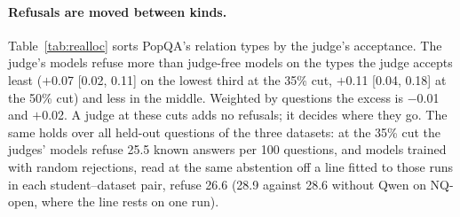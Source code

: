 \begin{table}[H]
\small
\centering
\setlength{\tabcolsep}{3.5pt}
\caption{A strict judge moves refusals between relation types. PopQA relation types sorted into fifths by how often the judge accepts the student's right answers of that type; share of known held-out answers refused by the judge's models and by models trained with random rejections at matched abstention. Four judges and both students pooled.}
\label{tab:realloc}
\end{table}

\paragraph{Refusals are moved between kinds.} Table~\ref{tab:realloc} sorts PopQA's relation types by the judge's acceptance. The judge's models refuse more than judge-free models on the types the judge accepts least ($+$0.07 [0.02, 0.11] on the lowest third at the 35\% cut, $+$0.11 [0.04, 0.18] at the 50\% cut) and less in the middle. Weighted by questions the excess is $-$0.01 and $+$0.02. A judge at these cuts adds no refusals; it decides where they go. The same holds over all held-out questions of the three datasets: at the 35\% cut the judges' models refuse 25.5 known answers per 100 questions, and models trained with random rejections, read at the same abstention off a line fitted to those runs in each student--dataset pair, refuse 26.6 (28.9 against 28.6 without Qwen on NQ-open, where the line rests on one run).

